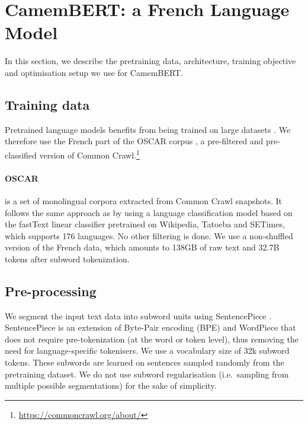 \documentclass[11pt,a4paper]{article}
\newcommand{\camembert}{CamemBERT\xspace}
\begin{document}
\section{\camembert: a French Language Model}\label{sec:Camembert}
In this section, we describe the pretraining data, architecture, training objective and optimisation setup we use for \camembert.


\subsection{Training data}
Pretrained language models benefits from being trained on large datasets \cite{devlin2018mbert,liu2019roberta,raffel2019exploring}. We therefore use the French part of the OSCAR corpus \cite{ortiz2019asynchronous}, a pre-filtered and pre-classified version of Common Crawl.\footnote{\url{https://commoncrawl.org/about/}} 

\paragraph{OSCAR} is a set of monolingual corpora extracted from Common Crawl snapshots\iffalse, specifically from the plain text \emph{WET} format distributed by Common Crawl which removes all the HTML tags and converts the text formatting to UTF-8\fi{}. It follows the same approach as \cite{grave2018learning} by using a language classification model based on the fastText linear classifier \cite{grave2017bag,joulin2016fasttext} pretrained on Wikipedia, Tatoeba and SETimes, which supports 176 languages. No other filtering is done. We use a non-shuffled version of the French data, which amounts to 138GB of raw text and 32.7B tokens after subword tokenization.











\subsection{Pre-processing}
We segment the input text data into subword units using SentencePiece \cite{kudo2018sentencepiece}.
SentencePiece is an extension of Byte-Pair encoding (BPE) \cite{sennrich2016neural} and WordPiece \cite{kudo2018subword} that does not require pre-tokenization (at the word or token level), thus removing the need for language-specific tokenisers.
We use a vocabulary size of 32k subword tokens. These subwords are learned on  sentences sampled randomly from the pretraining dataset.
We do not use subword regularisation (i.e.~sampling from multiple possible segmentations) for the sake of simplicity.
\end{document}
